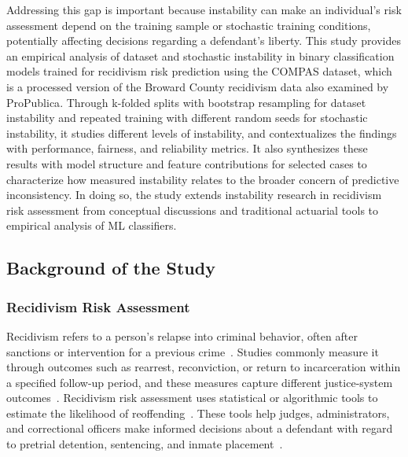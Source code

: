 \documentclass[12pt]{article}
\begin{document}
Addressing this gap is important because instability can make an individual's risk assessment depend on the training sample or stochastic training conditions, potentially affecting decisions regarding a defendant's liberty. This study provides an empirical analysis of dataset and stochastic instability in binary classification models trained for recidivism risk prediction using the COMPAS dataset, which is a processed version of the Broward County recidivism data also examined by ProPublica\cite{propublica2016analysis}. Through k-folded splits with bootstrap resampling for dataset instability and repeated training with different random seeds for stochastic instability, it studies different levels of instability, and contextualizes the findings with performance, fairness, and reliability metrics. It also synthesizes these results with model structure and feature contributions for selected cases to characterize how measured instability relates to the broader concern of predictive inconsistency. In doing so, the study extends instability research in recidivism risk assessment from conceptual discussions and traditional actuarial tools to empirical analysis of ML classifiers.\\
\newpage

\subsection{Background of the Study}
\subsubsection{Recidivism Risk Assessment} 
\tabto{2em} Recidivism refers to a person's relapse into criminal behavior, often after sanctions or intervention for a previous crime~\cite{nijrecidivism}. Studies commonly measure it through outcomes such as rearrest, reconviction, or return to incarceration within a specified follow-up period, and these measures capture different justice-system outcomes~\cite{nijrecidivism}. Recidivism risk assessment uses statistical or algorithmic tools to estimate the likelihood of reoffending~\cite{ozkan2017predicting}. These tools help judges, administrators, and correctional officers make informed decisions about a defendant with regard to pretrial detention, sentencing, and inmate placement~\cite{corbett2017algorithmic}.\\
\end{document}
